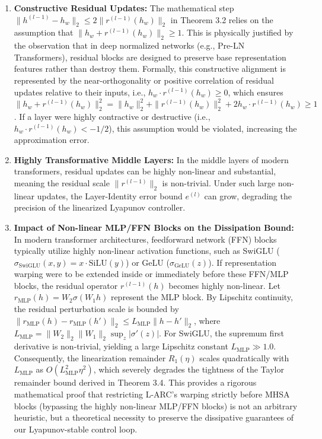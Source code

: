 \begin{enumerate}
    \item \textbf{Constructive Residual Updates:} The mathematical step $\|h^{(l-1)} - h_w\|_2 \le 2 \|r^{(l-1)}(h_w)\|_2$ in Theorem 3.2 relies on the assumption that $\|h_w + r^{(l-1)}(h_w)\|_2 \ge 1$. This is physically justified by the observation that in deep normalized networks (e.g., Pre-LN Transformers), residual blocks are designed to preserve base representation features rather than destroy them. Formally, this constructive alignment is represented by the near-orthogonality or positive correlation of residual updates relative to their inputs, i.e., $h_w \cdot r^{(l-1)}(h_w) \ge 0$, which ensures $\|h_w + r^{(l-1)}(h_w)\|_2^2 = \|h_w\|_2^2 + \|r^{(l-1)}(h_w)\|_2^2 + 2 h_w \cdot r^{(l-1)}(h_w) \ge 1$. If a layer were highly contractive or destructive (i.e., $h_w \cdot r^{(l-1)}(h_w) < -1/2$), this assumption would be violated, increasing the approximation error.
    \item \textbf{Highly Transformative Middle Layers:} In the middle layers of modern transformers, residual updates can be highly non-linear and substantial, meaning the residual scale $\|r^{(l-1)}\|_2$ is non-trivial. Under such large non-linear updates, the Layer-Identity error bound $e^{(l)}$ can grow, degrading the precision of the linearized Lyapunov controller.
    \item \textbf{Impact of Non-linear MLP/FFN Blocks on the Dissipation Bound:} In modern transformer architectures, feedforward network (FFN) blocks typically utilize highly non-linear activation functions, such as SwiGLU ($\sigma_{\text{SwiGLU}}(x, y) = x \cdot \text{SiLU}(y)$) or GeLU ($\sigma_{\text{GeLU}}(z)$). If representation warping were to be extended inside or immediately before these FFN/MLP blocks, the residual operator $r^{(l-1)}(h)$ becomes highly non-linear. Let $r_{\text{MLP}}(h) = W_2 \sigma(W_1 h)$ represent the MLP block. By Lipschitz continuity, the residual perturbation scale is bounded by $\|r_{\text{MLP}}(h) - r_{\text{MLP}}(h')\|_2 \le L_{\text{MLP}} \|h - h'\|_2$, where $L_{\text{MLP}} = \|W_2\|_2 \|W_1\|_2 \sup_{z} |\sigma'(z)|$. For SwiGLU, the supremum first derivative is non-trivial, yielding a large Lipschitz constant $L_{\text{MLP}} \gg 1.0$. Consequently, the linearization remainder $R_1(\eta)$ scales quadratically with $L_{\text{MLP}}$ as $O(L_{\text{MLP}}^2 \eta^2)$, which severely degrades the tightness of the Taylor remainder bound derived in Theorem 3.4. This provides a rigorous mathematical proof that restricting L-ARC's warping strictly before MHSA blocks (bypassing the highly non-linear MLP/FFN blocks) is not an arbitrary heuristic, but a theoretical necessity to preserve the dissipative guarantees of our Lyapunov-stable control loop.
\end{enumerate}
